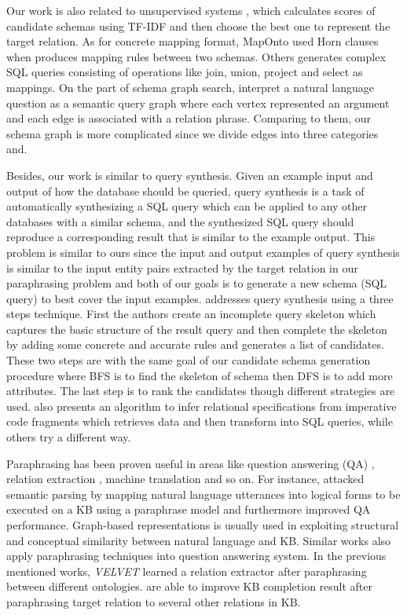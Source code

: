Our work is also related to unsupervised systems \cite{zou2014natural}, which calculates scores of candidate schemas using TF-IDF and then choose the best one to represent the target relation.
As for concrete mapping format, MapOnto \cite{an2006discovering} used Horn clauses when produces mapping rules between two schemas. Others \cite{zhang2012ontological} generates complex SQL queries consisting of operations like join, union, project and select as mappings.
On the part of schema graph search, \cite{zou2014natural} interpret a natural language question as a semantic query graph where each vertex represented an argument and each edge is associated with a relation phrase. Comparing to them, our schema graph is more complicated since we divide edges into three categories and.

Besides, our work is similar to query synthesis. Given an example input and output of how the database should be queried, query synthesis is a task of automatically synthesizing a SQL query which can be applied to any other databases with a similar schema, and the synthesized SQL query should reproduce a corresponding result that is similar to the example output. This problem is similar to ours since the input and output examples of query synthesis is similar to the input entity pairs extracted by the target relation in our paraphrasing problem and both of our goals is to generate a new schema (SQL query) to best cover the input examples. \cite{zhang2013automatically} addresses query synthesis using a three steps technique. First the authors create an incomplete query skeleton which captures the basic structure of the result query and then complete the skeleton by adding some concrete and accurate rules and generates a list of candidates. These two steps are with the same goal of our candidate schema generation procedure where BFS is to find the skeleton of schema then DFS is to add more attributes. The last step is to rank the candidates though different strategies are used. \cite{cheung2012inferring,cheung2013optimizing} also presents an algorithm to infer relational specifications from imperative code fragments which retrieves data and then transform into SQL queries, while others \cite{niehren2013query,das2010synthesizing} try a different way.

Paraphrasing has been proven useful in areas like question answering (QA) \cite{harabagiu2006methods}, relation extraction \cite{romano2006investigating}, machine translation and so on. For instance, \cite{berant2014semantic} attacked semantic parsing by mapping natural language utterances into logical forms to be executed on a KB using a paraphrase model and furthermore improved QA performance. Graph-based representations \cite{reddy2014large} is usually used in exploiting structural and conceptual similarity between natural language and KB. Similar works \cite{berant2013semantic,fader2013paraphrase,kwiatkowski2013scaling} also apply paraphrasing techniques into question answering system. In the previous mentioned works, \textit{VELVET} \cite{zhang2012ontological} learned a relation extractor after paraphrasing between different ontologies. \cite{gardnerefficient,lao2011random} are able to improve KB completion result after paraphrasing target relation to several other relations in KB. 
